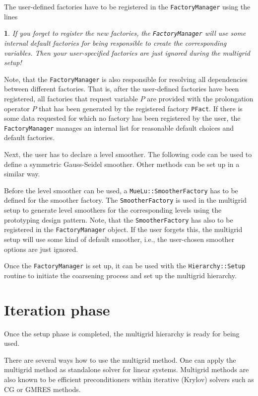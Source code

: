 \documentclass[10pt,fleqn]{book}
\newtheorem*{mycomment}{\ding{42}}
\providecommand\printCppListing[1]{

}
\begin{document}
The user-defined factories have to be registered in the \texttt{FactoryManager} using the lines
\printCppListing{ScalingTest.cpp_16.fragment}
\begin{mycomment}
If you forget to register the new factories, the \texttt{FactoryManager} will use some internal default factories for being responsible to create the corresponding variables. Then your user-specified factories are just ignored during the multigrid setup!
\end{mycomment}
Note, that the \texttt{FactoryManager} is also responsible for resolving all dependencies between different factories. That is, after the user-defined factories have been registered, all factories that request variable $P$ are provided with the prolongation operator $P$ that has been generated by the registered factory \texttt{PFact}. If there is some data requested for which no factory has been registered by the user, the \texttt{FactoryManager} manages an internal list for reasonable default choices and default factories.

Next, the user has to declare a level smoother. The following code can be used to define a symmetric Gauss-Seidel smoother. Other methods can be set up in a similar way.
\printCppListing{ScalingTest.cpp_18.fragment}
Before the level smoother can be used, a \texttt{MueLu::SmootherFactory} has to be defined for the smoother factory. The \texttt{SmootherFactory} is used in the multigrid setup to generate level smoothers for the corresponding levels using the prototyping design pattern. Note, that the \texttt{SmootherFactory} has also to be registered in the \texttt{FactoryManager} object. If the user forgets this, the multigrid setup will use some kind of default smoother, i.e., the user-chosen smoother options are just ignored.
\printCppListing{ScalingTest.cpp_20.fragment}
Once the \texttt{FactoryManager} is set up, it can be used with the \texttt{Hierarchy::Setup} routine to initiate the coarsening process and set up the multigrid hierarchy.
\printCppListing{ScalingTest.cpp_22.fragment}

\section{Iteration phase}
\label{sec:iterationphase}
Once the setup phase is completed, the \muelu multigrid hierarchy is ready for being used.

There are several ways how to use the multigrid method. One can apply the multigrid method as standalone solver for linear systems. Multigrid methods are also known to be efficient preconditioners within iterative (Krylov) solvers such as CG or GMRES methods.
\end{document}
